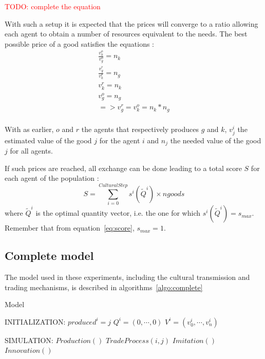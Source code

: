 \documentclass{wscpaperproc}
\newcommand{\memo}[2]{\textcolor{#1}{#2}}
\newcommand{\todo}[1]{\memo{red}{TODO: #1\\}}
\begin{document}
\todo{complete the equation}

With such a setup it is expected that the prices will converge to a ratio allowing each agent to obtain a number of resources equivalent to the needs. The best possible price of a good satisfies the equations :
\begin{align}
\frac{v^o_k}{v^o_g} = n_k \\
\frac{v^r_g}{v^r_k} = n_g \\
v^r_k = n_k \\
v^o_g = n_g \\
=>v^r_g = v^o_k = n_k * n_g \\
\end{align}

With as earlier, $o$ and $r$ the agents that respectively produces $g$ and $k$, $v_j^i$ the estimated value of the good $j$ for the agent $i$ and $n_j$ the needed value of the good $j$ for all agents.

If such prices are reached, all exchange can be done leading to a total score $S$ for each agent of the population : 
$$ S = \sum_{i=0}^{CulturalStep}  s^i(\tilde{Q}^i) \times ngoods $$ 
where $\tilde{Q}^i$ is the optimal quantity vector, i.e. the one for which $s^i(\tilde{Q}^i) = s_{max}$. Remember that from equation~\ref{eq:score}, $s_{max}=1$.


\subsection{Complete model}

The model used in these experiments, including the cultural transmission and trading mechanisms, is described in algorithms~\ref{algo:complete}

\begin{algorithm}
\caption{Model}
\label{algo:complete}
	\begin{algorithmic}[1]
	\scriptsize
	\State INITIALIZATION: 
			 
				\State $produced^i = j$
				\State $Q^i = (0, \cdots, 0)$
				\State $V^i = (v^i_0, \cdots, v^i_n)$ 
			\EndFor
		\EndFor

	\State SIMULATION:
				\State $Production()$
					\State $TradeProcess(i,j)$
				\EndFor				
					\State $Imitation()$
					\State $Innovation()$
				\EndIf
			\EndFor
		\EndLoop
\end{algorithmic}
\end{algorithm}
\end{document}
